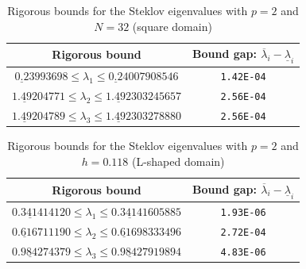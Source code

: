 \documentclass[a4,11pt]{article}
\numberwithin{equation}{section}
\begin{document}
\begin{table}[h]
\caption{Rigorous bounds for the Steklov eigenvalues with $p=2$ and $N=32$ (square domain) \label{table:square-stekolv-rigorous-bounds}}
\begin{center}
	\begin{tabular}{|c|c|}
 \hline
\rule[-0.2cm]{0cm}{0.60cm}{}
 Rigorous bound & Bound gap: $\overline{\lambda}_i - \underline{\lambda}_i$\\
 \hline
\rule[-0.2cm]{0cm}{0.60cm}{}
$\underline{0.2}3993698\le \lambda_1 \le \underline{0.2}4007908546 $ 
& \texttt{1.42E-04}
\\
\hline
\rule[-0.2cm]{0cm}{0.60cm}{} 
$\underline{1.492}04771\le \lambda_2 \le \underline{1.492}303245657 $
& \texttt{2.56E-04}
\\
\hline
\rule[-0.2cm]{0cm}{0.60cm}{} 
$\underline{1.492}04789\le \lambda_3 \le \underline{1.492}303278880$ &
\texttt{2.56E-04}
\\
\hline
\end{tabular}
\end{center}
\end{table}

%



\begin{table}[h]
\caption{Rigorous bounds for the Steklov eigenvalues with $p=2$ and $h=0.118$ (L-shaped domain) \label{table:L-stekolv-rigorous-bounds}}
\begin{center}
\begin{tabular}{|c|c|}
 \hline
\rule[-0.2cm]{0cm}{0.60cm}{}
Rigorous bound & Bound gap:
 $\overline{\lambda}_i - \underline{\lambda}_i$\\
 \hline
\rule[-0.2cm]{0cm}{0.60cm}{}
$\underline{0.34141}4120 \le \lambda_1 \le  \underline{0.34141}605885$ 
& \texttt{1.93E-06}  \\
 \hline
\rule[-0.2cm]{0cm}{0.60cm}{} 
$\underline{0.616}711190 \le \lambda_2 \le \underline{0.616}98333496$ 
& \texttt{2.72E-04}  \\
 \hline
\rule[-0.2cm]{0cm}{0.60cm}{} 
$\underline{0.98427}4379  \le \lambda_3 \le \underline{0.98427}919894$ 
& \texttt{4.83E-06}  \\
  \hline
\end{tabular}
\end{center}
\end{table}
\end{document}
